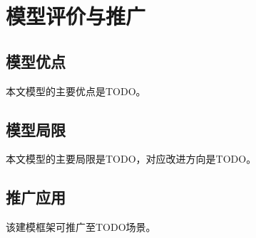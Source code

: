 \section{模型评价与推广}

\subsection{模型优点}

本文模型的主要优点是TODO。

\subsection{模型局限}

本文模型的主要局限是TODO，对应改进方向是TODO。

\subsection{推广应用}

该建模框架可推广至TODO场景。
